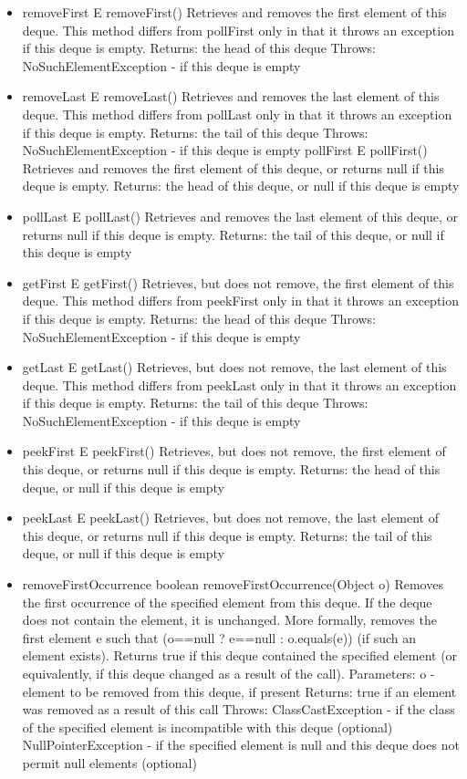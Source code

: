 \documentclass[babel]{book}
\begin{document}
\begin{itemize}
	\item removeFirst
	E removeFirst()
	Retrieves and removes the first element of this deque. This method differs from pollFirst only in that it throws an exception if this deque is empty.
	Returns:
	the head of this deque
	Throws:
	NoSuchElementException - if this deque is empty
	
	\item removeLast
	E removeLast()
	Retrieves and removes the last element of this deque. This method differs from pollLast only in that it throws an exception if this deque is empty.
	Returns:
	the tail of this deque
	Throws:
	NoSuchElementException - if this deque is empty
	pollFirst
	E pollFirst()
	Retrieves and removes the first element of this deque, or returns null if this deque is empty.
	Returns:
	the head of this deque, or null if this deque is empty
	
	\item pollLast
	E pollLast()
	Retrieves and removes the last element of this deque, or returns null if this deque is empty.
	Returns:
	the tail of this deque, or null if this deque is empty
	
	\item getFirst
	E getFirst()
	Retrieves, but does not remove, the first element of this deque. This method differs from peekFirst only in that it throws an exception if this deque is empty.
	Returns:
	the head of this deque
	Throws:
	NoSuchElementException - if this deque is empty
	
	\item getLast
	E getLast()
	Retrieves, but does not remove, the last element of this deque. This method differs from peekLast only in that it throws an exception if this deque is empty.
	Returns:
	the tail of this deque
	Throws:
	NoSuchElementException - if this deque is empty
	
	\item peekFirst
	E peekFirst()
	Retrieves, but does not remove, the first element of this deque, or returns null if this deque is empty.
	Returns:
	the head of this deque, or null if this deque is empty
	
	\item peekLast
	E peekLast()
	Retrieves, but does not remove, the last element of this deque, or returns null if this deque is empty.
	Returns:
	the tail of this deque, or null if this deque is empty
	
	\item removeFirstOccurrence
	boolean removeFirstOccurrence(Object o)
	Removes the first occurrence of the specified element from this deque. If the deque does not contain the element, it is unchanged. More formally, removes the first element e such that (o==null ? e==null : o.equals(e)) (if such an element exists). Returns true if this deque contained the specified element (or equivalently, if this deque changed as a result of the call).
	Parameters:
	o - element to be removed from this deque, if present
	Returns:
	true if an element was removed as a result of this call
	Throws:
	ClassCastException - if the class of the specified element is incompatible with this deque (optional)
	NullPointerException - if the specified element is null and this deque does not permit null elements (optional)
	

\end{itemize}
\end{document}
